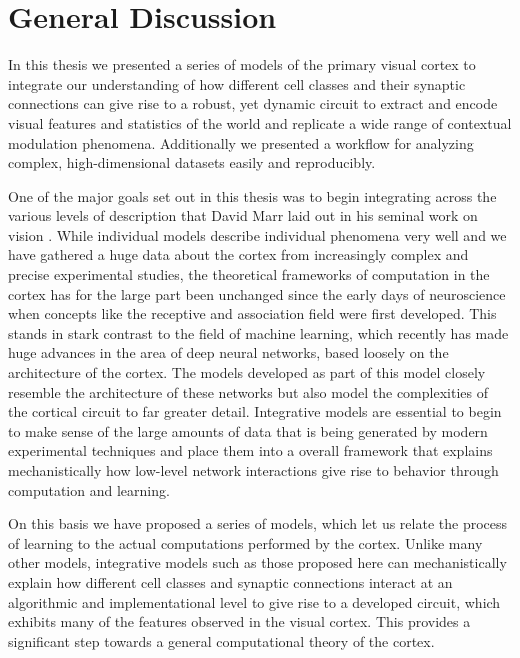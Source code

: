 \chapter{General Discussion}

In this thesis we presented a series of models of the primary visual
cortex to integrate our understanding of how different cell classes
and their synaptic connections can give rise to a robust, yet dynamic
circuit to extract and encode visual features and statistics of the
world and replicate a wide range of contextual modulation
phenomena. Additionally we presented a workflow for analyzing complex,
high-dimensional datasets easily and reproducibly.

One of the major goals set out in this thesis was to begin integrating
across the various levels of description that David Marr laid out in
his seminal work on vision \citep{Marr1982}. While individual models
describe individual phenomena very well and we have gathered a huge
data about the cortex from increasingly complex and precise
experimental studies, the theoretical frameworks of computation in the
cortex has for the large part been unchanged since the early days of
neuroscience when concepts like the receptive and association field
were first developed. This stands in stark contrast to the field of
machine learning, which recently has made huge advances in the area of
deep neural networks, based loosely on the architecture of the
cortex. The models developed as part of this model closely resemble
the architecture of these networks but also model the complexities of
the cortical circuit to far greater detail. Integrative models are
essential to begin to make sense of the large amounts of data that is
being generated by modern experimental techniques and place them into
a overall framework that explains mechanistically how low-level
network interactions give rise to behavior through computation and
learning.

On this basis we have proposed a series of models, which let us relate
the process of learning to the actual computations performed by the
cortex. Unlike many other models, integrative models such as those
proposed here can mechanistically explain how different cell classes
and synaptic connections interact at an algorithmic and
implementational level to give rise to a developed circuit, which
exhibits many of the features observed in the visual cortex. This
provides a significant step towards a general computational theory of
the cortex.


